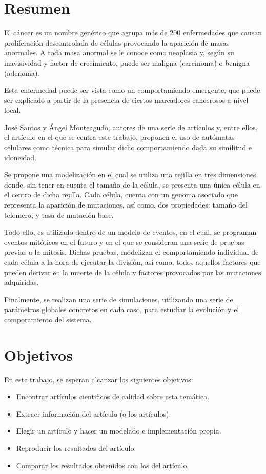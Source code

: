 \section{Resumen}

    El cáncer es un nombre genérico que agrupa más de 200 enfermedades que causan proliferación
    descontrolada de células provocando la aparición de masas anormales. A toda masa anormal se
    le conoce como neoplasia y, según su inavisividad y factor de crecimiento, puede ser maligna
    (carcinoma) o benigna (adenoma).

    Esta enfermedad puede ser vista como un comportamiendo emergente, que puede ser explicado a
    partir de la presencia de ciertos marcadores cancerosos a nivel local.

    José Santos y Ángel Monteagudo, autores de una serie de artículos y, entre ellos, el artículo
    en el que se centra este trabajo, proponen el uso de autómatas celulares como técnica para
    simular dicho comportamiendo dada su similitud e idoneidad.

    Se propone una modelización en el cual se utiliza una rejilla en tres dimensiones donde, sin
    tener en cuenta el tamaño de la célula, se presenta una única célula en el centro de dicha
    rejilla. Cada célula, cuenta con un genoma asociado que representa la aparición de mutaciones,
    así como, dos propiedades: tamaño del telomero, y tasa de mutación base.

    Todo ello, es utilizado dentro de un modelo de eventos, en el cual, se programan eventos mitóticos
    en el futuro y en el que se consideran una serie de pruebas previas a la mitosis. Dichas pruebas,
    modelizan el comportamiendo individual de cada célula a la hora de ejecutar la división, así como,
    todos aquellos factores que pueden derivar en la muerte de la célula y factores provocados
    por las mutaciones adquiridas.

    Finalmente, se realizan una serie de simulaciones, utilizando una serie de parámetros globales
    concretos en cada caso, para estudiar la evolución y el comporamiento del sistema.

\section{Objetivos}

	En este trabajo, se esperan alcanzar los siguientes objetivos:

	\begin{itemize}
        \item Encontrar artículos cientificos de calidad sobre esta temática.
        \item Extraer información del artículo (o los artículos).
        \item Elegir un artículo y hacer un modelado e implementación propia.
        \item Reproducir los resultados del artículo.
        \item Comparar los resultados obtenidos con los del artículo.
	\end{itemize}

